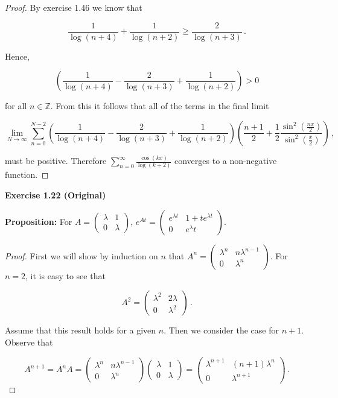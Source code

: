 \documentclass[a4paper]{article}
\numberwithin{equation}{section}
\begin{document}
\begin{description}
\begin{proof}
By exercise 1.46 we know that

$$\frac{1}{\log(n+4)} +\frac{1}{\log(n+2)} \geq \frac{2}{\log(n+3)}\,.$$

Hence, 

$$\left( \frac{1}{\log(n+4)} -\frac{2}{\log(n+3)} +\frac{1}{\log(n+2)} \right) > 0$$

for all $n \in \mathbb{Z}$. From this it follows that all of the terms in the final limit

$$\lim\limits_{N \rightarrow \infty}\sum \limits_{n=0}^{N-2}\left( \frac{1}{\log(n+4)} -\frac{2}{\log(n+3)} +\frac{1}{\log(n+2)} \right)\left(\frac{n+1}{2} + \frac{1}{2}\frac{\sin^2(\frac{nx}{2})}{\sin^2(\frac{x}{2})}\right)\,,$$

must be positive. Therefore $\sum \limits_{n=0}^\infty\frac{\cos(kx)}{\log(k+2)}$ converges to a non-negative function.

\end{proof}

\item \textbf{Exercise 1.22 (Original)}

\item \textbf{Proposition: }For $A = \begin{pmatrix}
\lambda & 1 \\
0 & \lambda
\end{pmatrix}$, $e^{At} = \begin{pmatrix}
e^{{\lambda}t} & 1+te^{{\lambda}t} \\
0 & {e^{\lambda}t}
\end{pmatrix}$.

\begin{proof} First we will show by induction on $n$ that $A^n = \begin{pmatrix}
\lambda^n & n\lambda^{n-1} \\
0 & \lambda^n
\end{pmatrix}$. For $n = 2$, it is easy to see that

$$A^2 = \begin{pmatrix}
\lambda^2 & 2\lambda^{} \\
0 & \lambda^2
\end{pmatrix}\,.$$

Assume that this result holds for a given $n$. Then we consider the case for $n+1$. Observe that

$$A^{n+1} = A^nA =  \begin{pmatrix}
\lambda^n & n\lambda^{n-1} \\
0 & \lambda^n
\end{pmatrix}\begin{pmatrix}
\lambda & 1 \\
0 & \lambda
\end{pmatrix} = \begin{pmatrix}
\lambda^{n+1} & (n+1)\lambda^{n} \\
0 & \lambda^{n+1}
\end{pmatrix}\,.$$


\end{proof}
\end{description}
\end{document}
